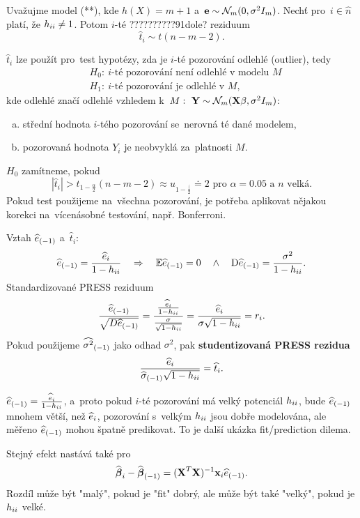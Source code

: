 \begin{corollary}
	Uvažujme model (**), kde $h(X)=m+1$ a~$\textbf{e}\sim\mathcal{N}_m(0,\sigma^2 I_m)$. Nechť pro~$i\in\hat{n}$ platí, že $h_{ii}\neq1$. Potom $i$-té ??????????91dole? reziduum 
	$$ \widehat{t}_i\sim t(n-m-2).$$
\end{corollary}
\begin{remark}
	$\widehat{t}_i$ lze použít pro~test hypotézy, zda je $i$-té pozorování odlehlé (outlier), tedy
	\[
	\begin{split}
	&H_0:~i\text{-té pozorování není odlehlé v~modelu }M\\
	&H_1:~i\text{-té pozorování je odlehlé v~}M,
	\end{split}
	\] kde odlehlé značí odlehlé vzhledem k~$M:~\textbf{Y}\sim\mathcal{N}_m(\textbf{X}\beta,\sigma^2 I_m)$:\begin{enumerate}[a)]
		\item střední hodnota $i$-tého pozorování se~nerovná té dané modelem,
		\item pozorovaná hodnota $Y_i$ je neobvyklá za~platnosti $M$.
	\end{enumerate}
$H_0$ zamítneme, pokud $$ |\widehat{t}_i|>t_{1-\frac{\alpha}{2}}(n-m-2)\approx u_{1-\frac{\lparen}{2}}\doteq 2\text{ pro~}\alpha=0.05\text{ a~}n\text{ velká}.$$
Pokud test použijeme na~všechna pozorování, je potřeba aplikovat nějakou korekci na~vícenásobné testování, např. Bonferroni.
\end{remark}
\begin{remark}
	Vztah ${\widehat{e}_{(-1)}}$ a~$\widehat{t}_i$:
	$$ {\widehat{e}_{(-1)}}=\frac{\widehat{e}_i}{1-h_{ii}}\quad\Rightarrow\quad\mathbb{E}{\widehat{e}_{(-1)}}=0\quad\wedge\quad \mathrm{D} {\widehat{e}_{(-1)}}=\frac{\sigma^2}{1-h_{ii}}.$$
	Standardizované PRESS reziduum $$\frac{{\widehat{e}_{(-1)}}}{\sqrt{D{\widehat{e}_{(-1)}}}}=\frac{\frac{\widehat{e}_i}{1-h_{ii}}}{\frac{\sigma}{\sqrt{1-h_{ii}}}}=\frac{\widehat{e}_i}{\sigma\sqrt{1-h_{ii}}}=r_i.$$
	Pokud použijeme ${\widehat{{\sigma}^2}_{(-1)}}$ jako odhad $\sigma^2$, pak \textbf{studentizovaná PRESS rezidua} $$\frac{\widehat{e}_i}{{\widehat{{\sigma}}_{(-1)}}\sqrt{1-h_{ii}}}=\widehat{t}_i.$$
\end{remark}
\begin{remark}
	${\widehat{e}_{(-1)}}=\frac{\widehat{e}_i}{1-h_{ii}}$, a~proto pokud $i$-té pozorování má velký potenciál $h_{ii}$, bude ${\widehat{e}_{(-1)}}$ mnohem větší, než $\widehat{e}_i$, pozorování s~velkým $h_{ii}$ jsou dobře modelována, ale měřeno ${\widehat{e}_{(-1)}}$ mohou špatně predikovat. To je další ukázka fit/prediction dilema.
	
	Stejný efekt nastává také pro~
	$$ \widehat{\boldsymbol{\beta}}_i-{\widehat{\boldsymbol{\beta}}_{(-1)}}=(\textbf{X}^T\textbf{X})^{-1}\textbf{x}_i{\widehat{e}_{(-1)}}.$$
	Rozdíl může být "malý", pokud je "fit" dobrý, ale může být také "velký", pokud je $h_{ii}$ velké.
\end{remark}

